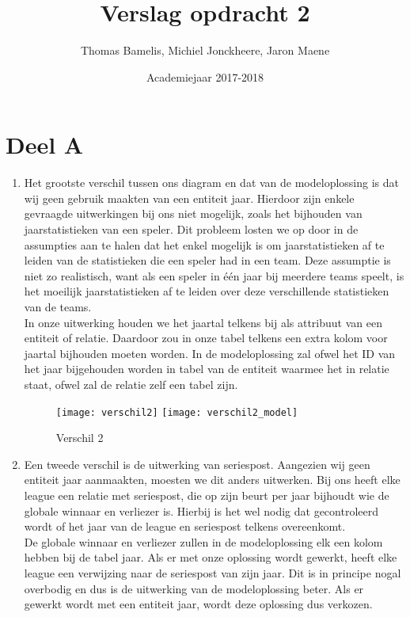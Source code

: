 \documentclass[a4paper,kulak]{kulakarticle}
\date{Academiejaar 2017-2018}
\title{Verslag opdracht 2}
\author{Thomas Bamelis, Michiel Jonckheere, Jaron Maene}
\begin{document}
\maketitle


\section{Deel A}
\begin{enumerate}
		\begin{figure}[!htb]
			\centering
			\texttt{[image: verschil1\_model]}
			\caption{Verschil 1}
			\label{fig:verschil1}
		\end{figure}
	\item Het grootste verschil tussen ons diagram en dat van de modeloplossing is dat wij geen gebruik maakten van een entiteit jaar. Hierdoor zijn enkele gevraagde uitwerkingen bij ons niet mogelijk, zoals het bijhouden van jaarstatistieken van een speler. Dit probleem losten we op door in de assumpties aan te halen dat het enkel mogelijk is om jaarstatistieken af te leiden van de statistieken die een speler had in een team. Deze assumptie is niet zo realistisch, want als een speler in één jaar bij meerdere teams speelt, is het moeilijk jaarstatistieken af te leiden over deze verschillende statistieken van de teams.\\
	In onze uitwerking houden we het jaartal telkens bij als attribuut van een entiteit of relatie. Daardoor zou in onze tabel telkens een extra kolom voor jaartal bijhouden moeten worden. In de modeloplossing zal ofwel het ID van het jaar bijgehouden worden in tabel van de entiteit waarmee het in relatie staat, ofwel zal de relatie zelf een tabel zijn. \\
	
		\begin{figure}[!htb]
			\centering
			\texttt{[image: verschil2]}
			\texttt{[image: verschil2\_model]}
			\caption{Verschil 2}
			\label{fig:verschil2}
		\end{figure}
	\item Een tweede verschil is de uitwerking van seriespost. Aangezien wij geen entiteit jaar aanmaakten, moesten we dit anders uitwerken. Bij ons heeft elke league een relatie met seriespost, die op zijn beurt per jaar bijhoudt wie de globale winnaar en verliezer is. Hierbij is het wel nodig dat gecontroleerd wordt of het jaar van de league en seriespost telkens overeenkomt. \\
	De globale winnaar en verliezer zullen in de modeloplossing elk een kolom hebben bij de tabel jaar. Als er met onze oplossing wordt gewerkt, heeft elke league een verwijzing naar de seriespost van zijn jaar. Dit is in principe nogal overbodig en dus is de uitwerking van de modeloplossing beter. Als er gewerkt wordt met een entiteit jaar, wordt deze oplossing dus verkozen.
	

\end{enumerate}
\end{document}
